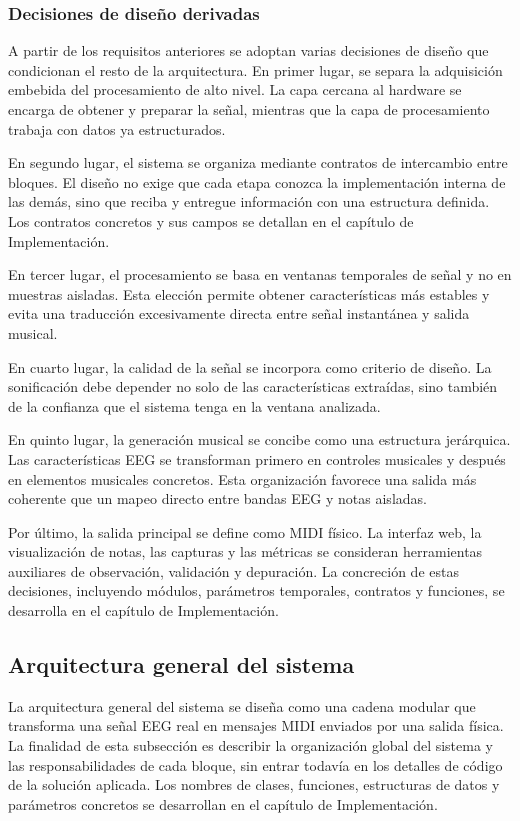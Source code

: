 \documentclass[../main.tex]{subfiles}
\begin{document}
\subsubsection{Decisiones de diseño derivadas}

A partir de los requisitos anteriores se adoptan varias decisiones de diseño que condicionan el resto de la arquitectura. En primer lugar, se separa la adquisición embebida del procesamiento de alto nivel. La capa cercana al hardware se encarga de obtener y preparar la señal, mientras que la capa de procesamiento trabaja con datos ya estructurados.

En segundo lugar, el sistema se organiza mediante contratos de intercambio entre bloques. El diseño no exige que cada etapa conozca la implementación interna de las demás, sino que reciba y entregue información con una estructura definida. Los contratos concretos y sus campos se detallan en el capítulo de Implementación.

En tercer lugar, el procesamiento se basa en ventanas temporales de señal y no en muestras aisladas. Esta elección permite obtener características más estables y evita una traducción excesivamente directa entre señal instantánea y salida musical.

En cuarto lugar, la calidad de la señal se incorpora como criterio de diseño. La sonificación debe depender no solo de las características extraídas, sino también de la confianza que el sistema tenga en la ventana analizada.

En quinto lugar, la generación musical se concibe como una estructura jerárquica. Las características EEG se transforman primero en controles musicales y después en elementos musicales concretos. Esta organización favorece una salida más coherente que un mapeo directo entre bandas EEG y notas aisladas.

Por último, la salida principal se define como MIDI físico. La interfaz web, la visualización de notas, las capturas y las métricas se consideran herramientas auxiliares de observación, validación y depuración. La concreción de estas decisiones, incluyendo módulos, parámetros temporales, contratos y funciones, se desarrolla en el capítulo de Implementación.

\subsection{Arquitectura general del sistema}

La arquitectura general del sistema se diseña como una cadena modular que transforma una señal EEG real en mensajes MIDI enviados por una salida física. La finalidad de esta subsección es describir la organización global del sistema y las responsabilidades de cada bloque, sin entrar todavía en los detalles de código de la solución aplicada. Los nombres de clases, funciones, estructuras de datos y parámetros concretos se desarrollan en el capítulo de Implementación.
\end{document}

